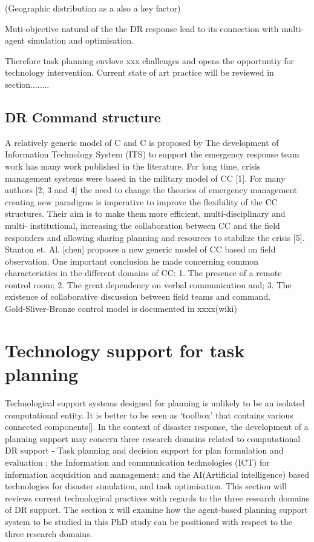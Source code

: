 (Geographic distribution as a also a key factor)

\noindent Muti-objective natural of the the DR response lead to its connection with multi-agent simulation and optimisation. 

Therefore task planning envlove xxx challenges and opens the opportuntiy for technology intervention. Current state of art practice will be reviewed in section........\\

\subsection{DR Command structure}


A relatively generic model of C and C is proposed by 
The development of Information Technology System (ITS)
to support the emergency response team work has many work published in the literature. For long time, crisis management systems were based in the military model of CC [1]. For many authors [2, 3 and 4] the need to change the theories of emergency management creating new paradigms is imperative to improve the flexibility of the CC structures. Their aim is to make them more
efficient, multi-disciplinary and multi-
institutional, increasing the collaboration between CC and the field responders and allowing sharing planning and resources to stabilize the crisis [5].
Stanton et. Al. [chen] proposes a new generic model of CC
based on field observation. One important conclusion he made concerning common characteristics in the different domains of CC:
1. The presence of a remote control room; 
2. The great dependency on verbal communication and;
3. The existence of collaborative discussion between field teams and command.\\


Gold-Sliver-Bronze control model is documented in xxxx(wiki)

\section{Technology support for task planning}
Technological support systems designed for planning is unlikely to be an isolated computational entity. It is better to be seen as `toolbox' that contains various connected components[]. In the context of disaster response, the development of a planning support may concern three research domains related to computational DR support - Task planning and decision support for plan formulation and evaluation ; the Information and communication technologies (ICT) for information acquisition and management; and the AI(Artificial intelligence) based technologies for disaster simulation, and task optimisation. This section will reviews current technological practices with regards to the three research domains of DR support. The section x will examine how the agent-based planning support system to be studied in this PhD study can be positioned with respect to the three research domains. \\

